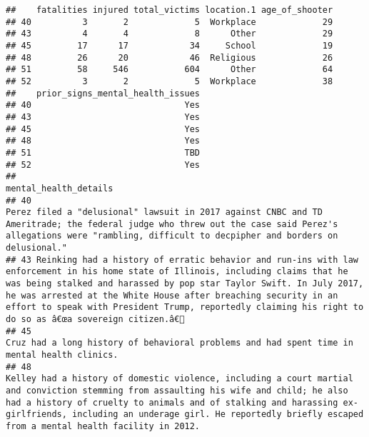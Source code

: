 \documentclass[
]{article}
\begin{document}
\begin{verbatim}
##    fatalities injured total_victims location.1 age_of_shooter
## 40          3       2             5  Workplace             29
## 43          4       4             8      Other             29
## 45         17      17            34     School             19
## 48         26      20            46  Religious             26
## 51         58     546           604      Other             64
## 52          3       2             5  Workplace             38
##    prior_signs_mental_health_issues
## 40                              Yes
## 43                              Yes
## 45                              Yes
## 48                              Yes
## 51                              TBD
## 52                              Yes
##                                                                                                                                                                                                                                                                                                                                                                      mental_health_details
## 40                                                                                                                                                                         Perez filed a "delusional" lawsuit in 2017 against CNBC and TD Ameritrade; the federal judge who threw out the case said Perez's allegations were "rambling, difficult to decpipher and borders on delusional."
## 43 Reinking had a history of erratic behavior and run-ins with law enforcement in his home state of Illinois, including claims that he was being stalked and harassed by pop star Taylor Swift. In July 2017, he was arrested at the White House after breaching security in an effort to speak with President Trump, reportedly claiming his right to do so as â€œa sovereign citizen.â€
## 45                                                                                                                                                                                                                                                                                             Cruz had a long history of behavioral problems and had spent time in mental health clinics.
## 48                                                             Kelley had a history of domestic violence, including a court martial and conviction stemming from assaulting his wife and child; he also had a history of cruelty to animals and of stalking and harassing ex-girlfriends, including an underage girl. He reportedly briefly escaped from a mental health facility in 2012.

\end{verbatim}
\end{document}
